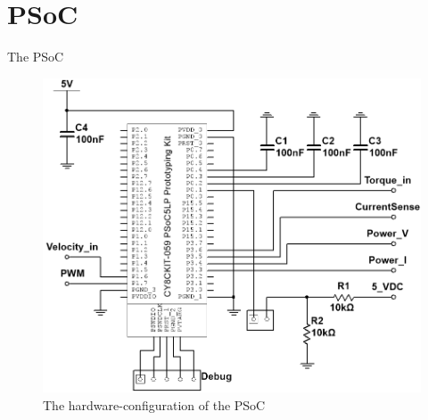 \newpage
\section{PSoC}
The PSoC 

\begin{figure}[H]
	\centering
	\includegraphics[width=0.8\linewidth]{Hardware/Pictures/PSoC}
	\caption{The hardware-configuration of the PSoC}
	\label{fig:PSoC_Hardware}
\end{figure}